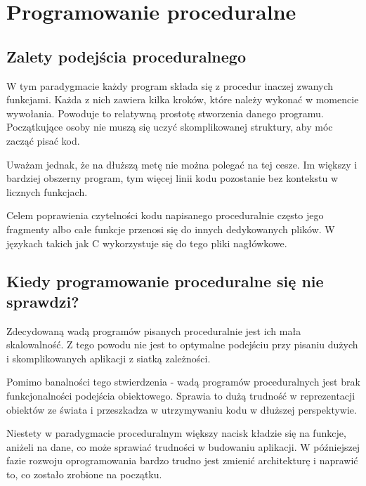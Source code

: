 \newpage

\section{Programowanie proceduralne}

\subsection{Zalety podejścia proceduralnego}

\begin{flushleft}
    W tym paradygmacie każdy program składa się z procedur inaczej zwanych funkcjami. Każda z nich zawiera kilka kroków, które należy wykonać w momencie wywołania. \cite{procedural-definition} Powoduje to relatywną prostotę stworzenia danego programu. Początkujące osoby nie muszą się uczyć skomplikowanej struktury, aby móc zacząć pisać kod.
\end{flushleft}

\begin{flushleft}
    Uważam jednak, że na dłuższą metę nie można polegać na tej cesze. Im większy i bardziej obszerny program, tym więcej linii kodu pozostanie bez kontekstu w licznych funkcjach.
\end{flushleft}

\begin{mdframed}[backgroundcolor=yellow!20]
    Celem poprawienia czytelności kodu napisanego proceduralnie często jego fragmenty albo całe funkcje przenosi się do innych dedykowanych plików. W językach takich jak C wykorzystuje się do tego pliki nagłówkowe. \cite{procedural-header-files}
\end{mdframed}

\subsection{Kiedy programowanie proceduralne się nie sprawdzi?}

\begin{mdframed}[backgroundcolor=yellow!20]
    Zdecydowaną wadą programów pisanych proceduralnie jest ich mała \linebreak skalowalność. Z tego powodu nie jest to optymalne podejściu przy pisaniu dużych i skomplikowanych aplikacji z siatką zależności.
\end{mdframed}

\begin{flushleft}
    Pomimo banalności tego stwierdzenia - wadą programów proceduralnych jest brak funkcjonalności podejścia obiektowego. Sprawia to dużą trudność w reprezentacji obiektów ze świata i przeszkadza w utrzymywaniu kodu w dłuższej perspektywie. \cite{procedural-drawbacks}
\end{flushleft}

\begin{flushleft}
    Niestety w paradygmacie proceduralnym większy nacisk kładzie się na funkcje, aniżeli na dane, co może sprawiać trudności w budowaniu aplikacji. W późniejszej fazie rozwoju oprogramowania bardzo trudno jest zmienić architekturę i naprawić to, co zostało zrobione na początku.
\end{flushleft}
